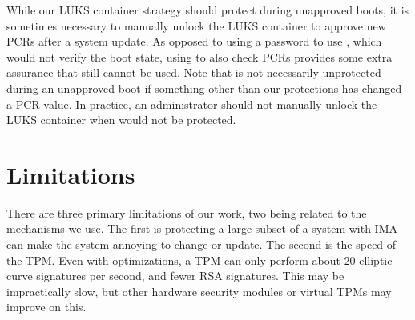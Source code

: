 \documentclass[12pt,letterpaper]{kuthesis}
\begin{document}

While our LUKS container strategy should protect \wcp during unapproved boots,
it is sometimes necessary to manually unlock the LUKS container to approve new PCRs after a system update.
As opposed to using a password to use \pk, which would not verify the boot state,
using \wcp to also check PCRs provides some extra assurance that \pk still cannot be used.
Note that \wcp is not necessarily unprotected during an unapproved boot if something other than our protections has changed a PCR value.
In practice, an administrator should not manually unlock the LUKS container when \wcp would not be protected.

\section{Limitations}\label{sec:limitations}
There are three primary limitations of our work, two being related to the mechanisms we use.
The first is protecting a large subset of a system with IMA can make the system annoying to change or update.
The second is the speed of the TPM.
Even with optimizations, a TPM can only perform about 20 elliptic curve signatures per second, and fewer RSA signatures.
This may be impractically slow, but other hardware security modules or virtual TPMs may improve on this.
\end{document}
